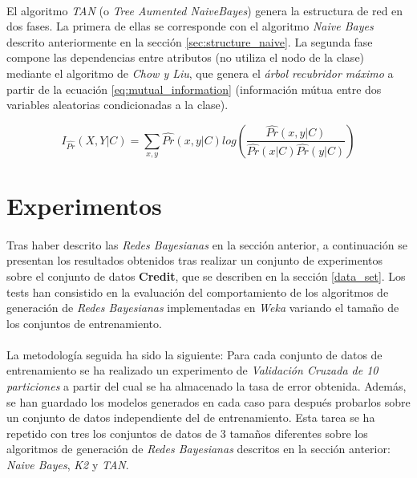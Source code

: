 \documentclass{article}
\begin{document}
			\paragraph{}
			El algoritmo \emph{TAN} (o \emph{Tree Aumented NaiveBayes}) genera la estructura de red en dos fases. La primera de ellas se corresponde con el algoritmo \emph{Naive Bayes} descrito anteriormente en la sección \ref{sec:structure_naive}. La segunda fase compone las dependencias entre atributos (no utiliza el nodo de la clase) mediante el algoritmo de \emph{Chow y Liu}, que genera el \emph{árbol recubridor máximo} a partir de la ecuación \eqref{eq:mutual_information} (información mútua entre dos variables aleatorias condicionadas a la clase).

			\begin{equation}
			\label{eq:mutual_information}
				I_{\hat{Pr}}(X, Y | C) = \sum_{x,y} \hat{Pr}(x,y | C) log(\frac{\hat{Pr}(x,y | C)}{\hat{Pr}(x| C)\hat{Pr}(y | C)})
			\end{equation}

	\section{Experimentos}
	\label{sec:experiments}

		\paragraph{}
		Tras haber descrito las \emph{Redes Bayesianas} en la sección anterior, a continuación se presentan los resultados obtenidos tras realizar un conjunto de experimentos sobre el conjunto de datos \textbf{Credit}, que se describen en la sección \ref{data_set}. Los tests han consistido en la evaluación del comportamiento de los algoritmos de generación de \emph{Redes Bayesianas} implementadas en \emph{Weka} \cite{tool:weka} variando el tamaño de los conjuntos de entrenamiento.

		\paragraph{}
		La metodología seguida ha sido la siguiente: Para cada conjunto de datos de entrenamiento se ha realizado un experimento de \emph{Validación Cruzada de 10 particiones} a partir del cual se ha almacenado la tasa de error obtenida. Además, se han guardado los modelos generados en cada caso para después probarlos sobre un conjunto de datos independiente del de entrenamiento. Esta tarea se ha repetido con tres los conjuntos de datos de 3 tamaños diferentes sobre los algoritmos de generación de \emph{Redes Bayesianas} descritos en la sección anterior: \emph{Naive Bayes}, \emph{K2} y \emph{TAN}.
\end{document}
